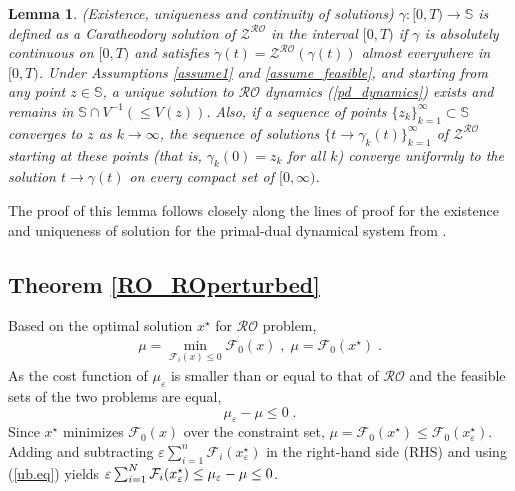 \documentclass[journal,twoside,web]{ieeecolor}
\newtheorem{lemma}{Lemma}
\begin{document}
\begin{lemma} \label{uniq_exis}
(Existence, uniqueness and continuity of solutions)
$\gamma:[0,T) \rightarrow {\mathbb S}$ is defined as a Caratheodory solution of $\mathcal{Z}^{\mathcal{RO}}$ in the interval $[0,T)$ if $\gamma$ is absolutely continuous on $[0,T)$ and satisfies $\dot \gamma(t)=\mathcal{Z}^{\mathcal{RO}} (\gamma(t))$ almost everywhere in $[0,T)$.
Under Assumptions \ref{assume1} and \ref{assume_feasible}, and starting from any point $z\in \mathbb S$, a unique solution to $\mathcal{RO}$ dynamics (\ref{pd_dynamics}) exists and remains in $\mathbb S \cap V^{-1}(\leq V(z))$. Also, if a sequence of points $\{z_k\}_{k=1}^\infty \subset {\mathbb S}$ converges to $z$ as $k \rightarrow \infty$, the sequence of solutions $\{t \rightarrow \gamma_k(t)\}_{k=1}^\infty$ of $\mathcal{Z}^{\mathcal{RO}}$ starting at these points (that is, $\gamma_k(0)=z_k$ for all $k$) converge uniformly to the solution $t \rightarrow \gamma(t)$ on every compact set of $[0,\infty)$.
\end{lemma}
The proof of this lemma follows closely along the lines of proof for the existence and uniqueness of solution for the primal-dual dynamical system from \cite[Lemma~4.3]{cherukuri2016}.


\subsection{Theorem \ref{RO_ROperturbed}}

Based on the optimal solution $x^\star$ for $\mathcal{RO}$ problem,
\begin{align*}
\mu=\min_{\mathcal{F}_i(x)\leq  0} \mathcal{F}_0(x)\;,\; \mu=\mathcal{F}_0(x^\star)\;.
\end{align*}
As the cost function of $\mu_\varepsilon$ is smaller than or equal to that of $\mathcal{RO}$ and the feasible sets of the two problems are equal,
\begin{equation}\label{ub.eq}
 \mu_\varepsilon-\mu\leq 0\;.
\end{equation}
Since $x^\star$ minimizes $\mathcal{F}_0(x)$ over the constraint set, $\mu=\mathcal{F}_0(x^\star)\leq \mathcal{F}_0(x_\varepsilon^\star)$.
Adding and subtracting $\varepsilon\sum_{i=1}^n\mathcal{F}_i(x^\star_\varepsilon)$
in the right-hand side (RHS) and using (\ref{ub.eq}) yields $\varepsilon \sum_{i=1}^N{\cal F}_{i}(x_\varepsilon^\star)\leq
\mu_\varepsilon-\mu\leq 0$\;.
\end{document}
